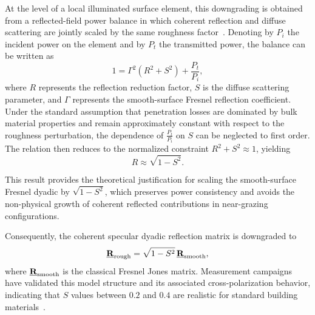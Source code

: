 At the level of a local illuminated surface element, this downgrading is obtained from a reflected-field power balance in which coherent reflection and diffuse scattering are jointly scaled by the same roughness factor~. Denoting by $P_i$ the incident power on the element and by $P_t$ the transmitted power, the balance can be written as
\begin{equation}
  1 = \Gamma^2\left(R^2 + S^2\right) + \frac{P_t}{P_i},
\end{equation}
where $R$ represents the reflection reduction factor, $S$ is the diffuse scattering parameter, and $\Gamma$ represents the smooth-surface Fresnel reflection coefficient. Under the standard assumption that penetration losses are dominated by bulk material properties and remain approximately constant with respect to the roughness perturbation, the dependence of $\tfrac{P_t}{P_i}$ on $S$ can be neglected to first order. The relation then reduces to the normalized constraint $R^2 + S^2 \approx 1$, yielding
\begin{equation}
  R \approx \sqrt{1 - S^2}.
\end{equation}

This result provides the theoretical justification for scaling the smooth-surface Fresnel dyadic by $\sqrt{1-S^2}$, which preserves power consistency and avoids the non-physical growth of coherent reflected contributions in near-grazing configurations.

Consequently, the coherent specular dyadic reflection matrix is downgraded to
\begin{equation}
  \underline{\mathbf{R}}_{\text{rough}} = \sqrt{1 - S^2} \, \underline{\mathbf{R}}_{\text{smooth}},
\end{equation}
where $\underline{\mathbf{R}}_{\text{smooth}}$ is the classical Fresnel Jones matrix. Measurement campaigns have validated this model structure and its associated cross-polarization behavior, indicating that $S$ values between $0.2$ and $0.4$ are realistic for standard building materials~.

